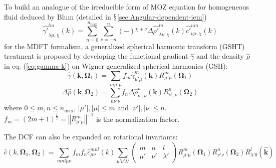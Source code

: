 To build an analogue of the irreducible form of \acs{MOZ} equation
for homogeneous fluid deduced by Blum (detailed in $\mathsection$\ref{sec:Angular-dependent-iem})
\begin{equation}
\hat{\gamma'}_{\lambda\mu,\chi}^{lm}(k)=\sum_{n=0}^{n_{\mathrm{max}}}\sum_{\nu=-n}^{n}\left(-\right){}^{\chi+\nu}\Delta\hat{\rho'}_{\lambda\underline{\nu},\chi}^{ln}(k)\hat{c'}_{\nu\mu,\chi}^{nm}(k)\label{eq:Blum-reduced-OZ}
\end{equation}
for the \acs{MDFT} formalism, a generalized spherical harmonic transform
(\acs{GSHT}) treatment is proposed by developing the functional gradient
$\hat{\gamma}$ and the density $\hat{\rho}$ in eq. (\ref{eq:gamma-k})
on Wigner generalized spherical harmonics (\acs{GSH}):
\begin{equation}
\hat{\gamma}(\mathbf{k},\mathbf{\Omega}_{1})=\sum_{m\mu'\mu}f_{m}\hat{\gamma}_{\mu'\mu}^{m}(\mathbf{k})R_{\mu'\mu}^{m}(\mathbf{\Omega}_{1})\label{eq:gamma-projection}
\end{equation}
\begin{equation}
\Delta\hat{\rho}(\mathbf{k},\mathbf{\Omega}_{2})=\sum_{n\nu'\nu}f_{n}\Delta\hat{\rho}_{\nu',\nu}^{n}(\mathbf{k})R_{\nu',\nu}^{n}(\mathbf{\Omega}_{2})\label{eq:delta-rho-projection}
\end{equation}
where $0\leq m,n\leq n_{\mathrm{max}}$, $\left|\mu'\right|,\left|\mu\right|\leq m$
and $\left|\nu'\right|,\left|\nu\right|\leq n$. $f_{m}=\left(2m+1\right)^{\frac{1}{2}}=\left\Vert R_{\mu'\mu}^{m}\right\Vert ^{-1}$
is the normalization factor.

The \acs{DCF} can also be expanded on rotational invariants:
\begin{equation}
\hat{c}(k,\mathbf{\Omega}_{1},\mathbf{\Omega}_{2})=\sum_{mnl\mu\nu}f_{m}f_{n}\hat{c}_{\mu\nu}^{mnl}(k)\sum_{\mu'\nu'\lambda'}\left(\begin{array}{ccc}
m & n & l\\
\mu' & \nu' & \lambda'
\end{array}\right)R_{\mu'\mu}^{m}(\mathbf{\Omega}_{1})R_{\nu'\nu}^{n}(\mathbf{\Omega}_{2})R_{\lambda'0}^{l}(\hat{\mathbf{k}})\label{eq:c-projection}
\end{equation}

